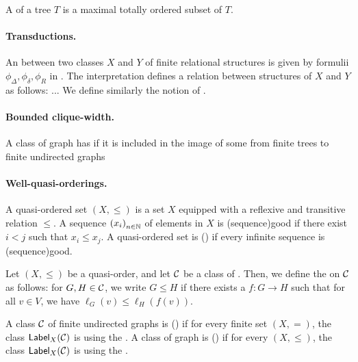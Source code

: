\AP
A  of a tree $T$ is a maximal totally ordered subset of $T$.

\paragraph*{Transductions.} An  between two
classes $X$ and $Y$ of finite relational structures is given by formulii
$\phi_{\Delta}, \phi_{\delta}, \phi_{R}$ in .
The interpretation defines a relation between structures of $X$ and $Y$ as
follows: ... We define similarly the notion of .

\paragraph*{Bounded clique-width.} A class of graph has  if it is included in the image of some 
from finite trees to finite undirected graphs \cite{COUR91}


\paragraph*{Well-quasi-orderings.} A quasi-ordered set $(X, \leq)$ is a set $X$
equipped with a reflexive and transitive relation $\leq$. A sequence
$\seqof{x_i}$ of elements in $X$ is \intro(sequence){good} if there exist $i <
j$ such that $x_i \leq x_j$. A quasi-ordered set is 
() if every infinite sequence is \kl(sequence){good}.

\AP Let $(X, \leq)$ be a quasi-order, and let $\mathcal{C}$ be a class of
. Then, we define the 
on $\mathcal{C}$ as follows: for $G, H \in \mathcal{C}$, we write $G \leq H$ if there exists
a  $f \colon G \to H$ such that for all $v \in V$, we have
$\ell_G(v) \leq \ell_H(f(v))$. 

\AP A class $\mathcal{C}$ of finite undirected graphs is
 () if for every
finite set $(X,=)$, the class $\mathsf{Label}_{X}(\mathcal{C})$ is 
using the . A class of graph is
 () if for every
 $(X, \leq)$, the class $\mathsf{Label}_{X}(\mathcal{C})$ is
 using the .







